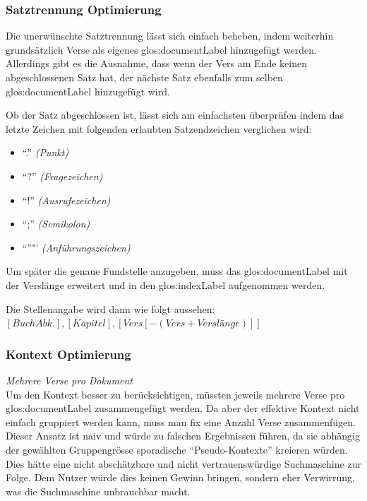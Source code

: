 \subsubsection{Satztrennung Optimierung}
Die unerwünschte Satztrennung lässt sich einfach beheben, indem weiterhin grundsätzlich Verse als eigenes \gls{glos:documentLabel} hinzugefügt werden.
Allerdings gibt es die Ausnahme, dass wenn der Vers am Ende keinen abgeschlossenen Satz hat, der nächste Satz ebenfalls zum selben \gls{glos:documentLabel} hinzugefügt wird.

Ob der Satz abgeschlossen ist, lässt sich am einfachsten überprüfen indem das letzte Zeichen mit folgenden erlaubten Satzendzeichen verglichen wird:
\begin{itemize}[noitemsep]
	\item "`."' \textit{(Punkt)}
	\item "`?"' \textit{(Fragezeichen)}
	\item "`!"' \textit{(Ausrufezeichen)}
	\item "`;"' \textit{(Semikolon)}
	\item "`"'"' \textit{(Anführungszeichen)}
\end{itemize}

Um später die genaue Fundstelle anzugeben, muss das \gls{glos:documentLabel} mit der Verslänge erweitert und in den \gls{glos:indexLabel} aufgenommen werden.

Die Stellenangabe wird dann wie folgt aussehen:\\
$[Buch Abk.], [Kapitel],[Vers[-(Vers + Verslänge)]]$

\subsubsection{Kontext Optimierung}
\label{sec:contextOptimaze}
\textit{Mehrere Verse pro Dokument}
\vspace{0.5em}\\
Um den Kontext besser zu berücksichtigen, müssten jeweils mehrere Verse pro \gls{glos:documentLabel} zusammengefügt werden.
Da aber der effektive Kontext nicht einfach gruppiert werden kann, muss man fix eine Anzahl Verse zusammenfügen.
Dieser Ansatz ist naiv und würde zu falschen Ergebnissen führen, da sie abhängig der gewählten Gruppengrösse sporadische "`Pseudo-Kontexte"' kreieren würden.
Dies hätte eine nicht abschätzbare und nicht vertrauenswürdige Suchmaschine zur Folge.
Dem Nutzer würde dies keinen Gewinn bringen, sondern eher Verwirrung, was die Suchmaschine unbrauchbar macht.

